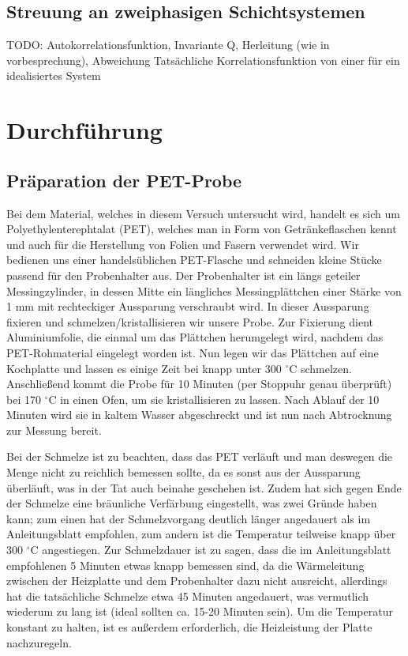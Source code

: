 \documentclass[bigchapter,colorback,accentcolor=tud4b,linedtoc,11pt]{tudreport}
\begin{document}
\section{Streuung an zweiphasigen Schichtsystemen}
TODO: Autokorrelationsfunktion, Invariante Q, Herleitung (wie in vorbesprechung), Abweichung Tatsächliche Korrelationsfunktion von einer für ein idealisiertes System


\chapter{Durchführung}
\section{Präparation der PET-Probe}

Bei dem Material, welches in diesem Versuch untersucht wird, handelt es sich um Polyethylenterephtalat (PET), welches man in Form von Getränkeflaschen kennt und auch für die Herstellung von Folien und Fasern verwendet wird. Wir bedienen uns einer handelsüblichen PET-Flasche und schneiden kleine Stücke passend für den Probenhalter aus. Der Probenhalter ist ein längs geteiler Messingzylinder, in dessen Mitte ein längliches Messingplättchen einer Stärke von 1 mm mit rechteckiger Aussparung verschraubt wird. In dieser Aussparung fixieren und schmelzen/kristallisieren wir unsere Probe. Zur Fixierung dient Aluminiumfolie, die einmal um das Plättchen herumgelegt wird, nachdem das PET-Rohmaterial eingelegt worden ist. Nun legen wir das Plättchen auf eine Kochplatte und lassen es einige Zeit bei knapp unter 300 $^{\circ}$C schmelzen. Anschließend kommt die Probe für 10 Minuten (per Stoppuhr genau überprüft) bei 170 $^{\circ}$C in einen Ofen, um sie kristallisieren zu lassen. Nach Ablauf der 10 Minuten wird sie in kaltem Wasser abgeschreckt und ist nun nach Abtrocknung zur Messung bereit. 

Bei der Schmelze ist zu beachten, dass das PET verläuft und man deswegen die Menge nicht zu reichlich bemessen sollte, da es sonst aus der Aussparung überläuft, was in der Tat auch beinahe geschehen ist. Zudem hat sich gegen Ende der Schmelze eine bräunliche Verfärbung eingestellt, was zwei Gründe haben kann; zum einen hat der Schmelzvorgang deutlich länger angedauert als im Anleitungsblatt empfohlen, zum andern ist die Temperatur teilweise knapp über 300 $^{\circ}$C angestiegen. Zur Schmelzdauer ist zu sagen, dass die im Anleitungsblatt empfohlenen 5 Minuten etwas knapp bemessen sind, da die Wärmeleitung zwischen der Heizplatte und dem Probenhalter dazu nicht ausreicht, allerdings hat die tatsächliche Schmelze etwa 45 Minuten angedauert, was vermutlich wiederum zu lang ist (ideal sollten ca. 15-20 Minuten sein). Um die Temperatur konstant zu halten, ist es außerdem erforderlich, die Heizleistung der Platte nachzuregeln.
\end{document}

